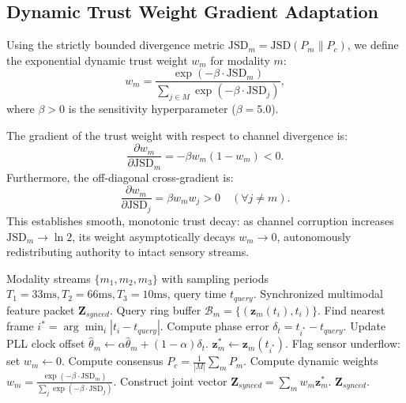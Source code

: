 \documentclass[conference]{IEEEtran}
\begin{document}
\subsection{Dynamic Trust Weight Gradient Adaptation}
Using the strictly bounded divergence metric $\mathrm{JSD}_m = \mathrm{JSD}(P_m \parallel P_c)$, we define the exponential dynamic trust weight $w_m$ for modality $m$:
\begin{equation}
w_m = \frac{\exp(-\beta \cdot \mathrm{JSD}_m)}{\sum_{j \in M} \exp(-\beta \cdot \mathrm{JSD}_j)},
\end{equation}
where $\beta > 0$ is the sensitivity hyperparameter ($\beta = 5.0$).

The gradient of the trust weight with respect to channel divergence is:
\begin{equation}
\frac{\partial w_m}{\partial \mathrm{JSD}_m} = -\beta w_m (1 - w_m) < 0.
\end{equation}
Furthermore, the off-diagonal cross-gradient is:
\begin{equation}
\frac{\partial w_m}{\partial \mathrm{JSD}_j} = \beta w_m w_j > 0 \quad (\forall j \neq m).
\end{equation}
This establishes smooth, monotonic trust decay: as channel corruption increases $\mathrm{JSD}_m \to \ln 2$, its weight asymptotically decays $w_m \to 0$, autonomously redistributing authority to intact sensory streams.

\begin{algorithm}[t]
\caption{Asynchronous Multi-Rate Ring Buffer Synchronization}
\label{alg:multirate_sync}
\begin{algorithmic}[1]
\REQUIRE Modality streams $\{m_1, m_2, m_3\}$ with sampling periods $T_1=33\text{ms}, T_2=66\text{ms}, T_3=10\text{ms}$, query time $t_{query}$.
\ENSURE Synchronized multimodal feature packet $\mathbf{Z}_{synced}$.
    \STATE Query ring buffer $\mathcal{B}_m = \{(\mathbf{z}_m(t_i), t_i)\}$.
    \STATE Find nearest frame $i^* = \arg\min_i |t_i - t_{query}|$.
        \STATE Compute phase error $\delta_t = t_{i^*} - t_{query}$.
        \STATE Update PLL clock offset $\hat{\theta}_m \leftarrow \alpha \hat{\theta}_m + (1-\alpha) \delta_t$.
        \STATE $\mathbf{z}_m^* \leftarrow \mathbf{z}_m(t_{i^*})$.
    \ELSE
        \STATE Flag sensor underflow: set $w_m \leftarrow 0$.
    \ENDIF
\ENDFOR
\STATE Compute consensus $P_c = \frac{1}{|M|}\sum_m P_m$.
\STATE Compute dynamic weights $w_m = \frac{\exp(-\beta \cdot \mathrm{JSD}_m)}{\sum_j \exp(-\beta \cdot \mathrm{JSD}_j)}$.
\STATE Construct joint vector $\mathbf{Z}_{synced} = \sum_m w_m \mathbf{z}_m^*$.
\RETURN $\mathbf{Z}_{synced}$.
\end{algorithmic}
\end{algorithm}
\end{document}
